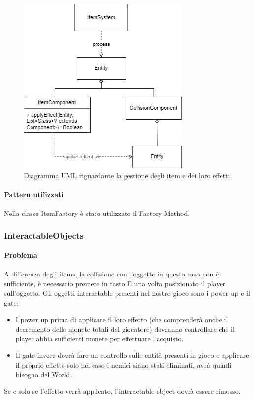 \documentclass[a4paper,12pt]{report}
\begin{document}
	\begin{figure}[h]
		\centering
		\includegraphics[width=\textwidth]{uml/uml_itemSystem.png}
		\caption{Diagramma UML riguardante la gestione degli item e dei loro effetti}
	\end{figure}
	
\paragraph*{Pattern utilizzati}
	Nella classe ItemFactory è stato utilizzato il Factory Method.

\subsubsection*{InteractableObjects}
\paragraph*{Problema}
	A differenza degli items, la collisione con l'oggetto in questo caso non è sufficiente, è necessario premere in tasto E una volta posizionato il player sull'oggetto.
	Gli oggetti interactable presenti nel nostro gioco sono i power-up e il gate:
	\begin{itemize} 
		\item I power up prima di applicare il loro effetto (che comprenderà anche il decremento delle monete totali del giocatore) dovranno controllare che il player abbia sufficienti monete per effettuare l'acquisto.
		\item Il gate invece dovrà fare un controllo sulle entità presenti in gioco e applicare il proprio effetto solo nel caso i nemici siano stati eliminati, avrà quindi bisogno del World.
	\end{itemize}
	Se e solo se l'effetto verrà applicato, l'interactable object dovrà essere rimosso. 
\end{document}
